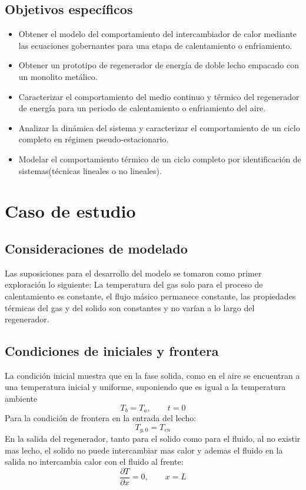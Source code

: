 \documentclass[12pt,letterpaper,final]{article}%
\begin{document}
\subsection{Objetivos espec\'ificos}
\begin{itemize}
	\item Obtener el modelo del comportamiento del intercambiador de calor mediante las ecuaciones gobernantes para una etapa de calentamiento o enfriamiento.
	\item Obtener un prototipo  de regenerador de energía de doble lecho empacado con un monolito metálico.
	\item Caracterizar el comportamiento del medio continuo y térmico del regenerador de energía para un periodo de calentamiento o enfriamiento del aire.
	\item Analizar la dinámica del sistema y caracterizar el comportamiento de un ciclo completo en régimen pseudo-estacionario.
	\item Modelar el comportamiento térmico de un ciclo completo por identificación de sistemas(técnicas lineales o no lineales).
	
\end{itemize}
\newpage
\section{Caso de estudio}
\subsection{Consideraciones de modelado }
Las suposiciones para el desarrollo del modelo se tomaron como primer exploración lo siguiente: La temperatura del gas solo para el proceso de calentamiento es constante, el flujo másico permanece constante, las propiedades térmicas del gas y del solido son constantes y no varían a lo largo del regenerador.
\subsection{Condiciones de iniciales y frontera}
La condición inicial muestra que en la fase solida, como en el aire se encuentran a una temperatura inicial y uniforme, suponiendo que es igual a la temperatura ambiente
\begin{equation}
	T_b=T_a , \qquad t=0
\end{equation} 
Para la condición de frontera en la entrada del lecho:
\begin{equation}
	T_{g,0}=T_{en}
\end{equation}
En la salida del regenerador, tanto para el solido como para el fluido, al no existir mas lecho, el solido no puede intercambiar mas calor y ademas el fluido en la salida no intercambia calor con el fluido al frente:
\begin{equation}\label{Solido}
	\frac{\partial T}{\partial x} = 0, \qquad x=L
\end{equation}
\end{document}
